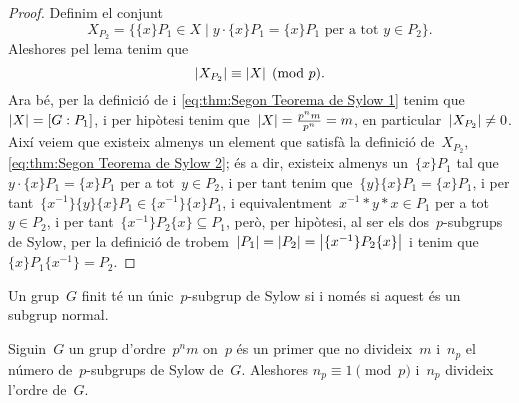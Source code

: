 \documentclass[../../main.tex]{subfiles}
\begin{document}
\begin{proof}
        Definim el conjunt
        \begin{equation}
    \label{eq:thm:Segon Teorema de Sylow 2}
        X_{P_{2}}=\{\{x\}P_{1}\in X\mid y\cdot\{x\}P_{1}=\{x\}P_{1}\text{ per a tot }y\in P_{2}\}.
        \end{equation}
        Aleshores pel lema  tenim que
        \begin{equation*}
        \abs{X_{P_{2}}}\equiv\abs{X}\pmod{p}.
        \end{equation*}
        Ara bé, per la definició de  i \eqref{eq:thm:Segon Teorema de Sylow 1} tenim que~\(\abs{X}=[G:P_{1}]\), i per hipòtesi tenim que~\(\abs{X}=\frac{p^{n}m}{p^{n}}=m\), en particular~\(\abs{X_{P_{2}}}\neq0\).
        Així veiem que existeix almenys un element que satisfà la definició de~\(X_{P_{2}}\), \eqref{eq:thm:Segon Teorema de Sylow 2}; és a dir, existeix almenys un~\(\{x\}P_{1}\) tal que~\(y\cdot\{x\}P_{1}=\{x\}P_{1}\) per a tot~\(y\in P_{2}\), i per tant tenim que~\(\{y\}\{x\}P_{1}=\{x\}P_{1}\), i per tant~\(\{x^{-1}\}\{y\}\{x\}P_{1}\in \{x^{-1}\}\{x\}P_{1}\), i equivalentment~\(x^{-1}\ast y\ast x\in P_{1}\) per a tot~\(y\in P_{2}\), i per tant~\(\{x^{-1}\}P_{2}\{x\}\subseteq P_{1}\), però, per hipòtesi, al ser els dos~\(p\)-subgrups de Sylow, per la definició de  trobem~\(\abs{P_{1}}=\abs{P_{2}}=\abs{\{x^{-1}\}P_{2}\{x\}}\) i tenim que~\(\{x\}P_{1}\{x^{-1}\}=P_{2}\).
    \end{proof}
    \begin{corollary}
        \label{corollary:Segon Teorema de Sylow} %
        Un grup~\(G\) finit té un únic~\(p\)-subgrup de Sylow si i només si aquest és un subgrup normal.
    \end{corollary}
    \begin{theorem}
        \label{thm:Tercer Teorema de Sylow}
        Siguin~\(G\) un grup d'ordre~\(p^{n}m\) on~\(p\) és un primer que no divideix~\(m\) i~\(n_{p}\) el número de~\(p\)-subgrups de Sylow de~\(G\).
        Aleshores
        \(n_{p}\equiv1\pmod{p}\) i~\(n_{p}\) divideix l'ordre de~\(G\).
    \end{theorem}
\end{document}
